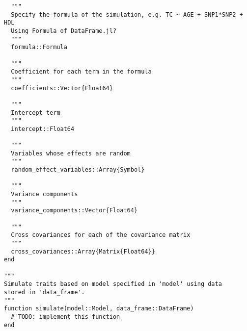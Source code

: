 \documentclass[12pt]{article}
\begin{document}
\begin{spacing}{1.0}
\begin{lstlisting}
  """
  Specify the formula of the simulation, e.g. TC ~ AGE + SNP1*SNP2 + HDL
  Using Formula of DataFrame.jl?
  """
  formula::Formula

  """
  Coefficient for each term in the formula
  """
  coefficients::Vector{Float64}
  
  """
  Intercept term
  """
  intercept::Float64

  """
  Variables whose effects are random
  """
  random_effect_variables::Array{Symbol}

  """
  Variance components
  """
  variance_components::Vector{Float64}

  """
  Cross covariances for each of the covariance matrix
  """
  cross_covariances::Array{Matrix{Float64}}
end

"""
Simulate traits based on model specified in 'model' using data
stored in 'data_frame'.
"""
function simulate(model::Model, data_frame::DataFrame)
  # TODO: implement this function
end
\end{lstlisting}

\end{spacing}
\end{document}
